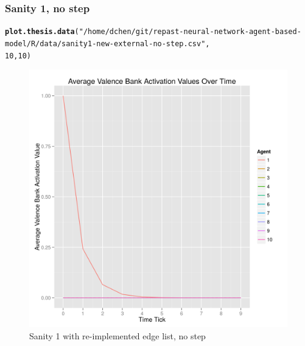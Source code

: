 \documentclass{article}\usepackage[]{graphicx}\usepackage[]{color}
\makeatletter
\def\maxwidth{ %
  \ifdim\Gin@nat@width>\linewidth
    \linewidth
  \else
    \Gin@nat@width
  \fi
}
\newcommand{\hlnum}[1]{\textcolor[rgb]{0.686,0.059,0.569}{#1}}%
\newcommand{\hlstr}[1]{\textcolor[rgb]{0.192,0.494,0.8}{#1}}%
\newcommand{\hlstd}[1]{\textcolor[rgb]{0.345,0.345,0.345}{#1}}%
\newcommand{\hlkwd}[1]{\textcolor[rgb]{0.737,0.353,0.396}{\textbf{#1}}}%
\newenvironment{kframe}{%
 \def\at@end@of@kframe{}%
 \ifinner\ifhmode%
  \def\at@end@of@kframe{\end{minipage}}%
  \begin{minipage}{\columnwidth}%
 \fi\fi%
 \def\FrameCommand##1{\hskip\@totalleftmargin \hskip-\fboxsep
 \colorbox{shadecolor}{##1}\hskip-\fboxsep
     \hskip-\linewidth \hskip-\@totalleftmargin \hskip\columnwidth}%
 \MakeFramed {\advance\hsize-\width
   \@totalleftmargin\z@ \linewidth\hsize
   \@setminipage}}%
 {\par\unskip\endMakeFramed%
 \at@end@of@kframe}
\newenvironment{knitrout}{}{} %
\makeatother
\begin{document}
\subsubsection{Sanity 1, no step}
\begin{knitrout}
\color{fgcolor}\begin{kframe}
\begin{alltt}
\hlkwd{plot.thesis.data}\hlstd{(}\hlstr{"/home/dchen/git/repast-neural-network-agent-based-model/R/data/sanity1-new-external-no-step.csv"}\hlstd{,}
    \hlnum{10}\hlstd{,} \hlnum{10}\hlstd{)}
\end{alltt}
\end{kframe}\begin{figure}[]

\includegraphics[width=\maxwidth]{figure/plot-sanity1-v2-nostep} \caption[Sanity 1 with re-implemented edge list, no step]{Sanity 1 with re-implemented edge list, no step\label{fig:plot-sanity1-v2-nostep}}
\end{figure}


\end{knitrout}


\newpage
\end{document}
